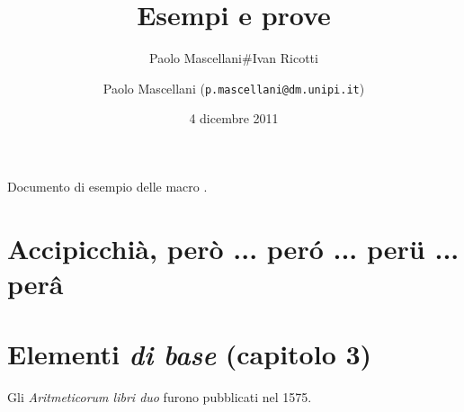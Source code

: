 \documentclass[12pt]{book}
\begin{document}
\htmlcut[inizio]
\par
{}
\title{Esempi e prove \MauroTeX}
\author{Paolo Mascellani#Ivan Ricotti}
\par
{}
\par
{}
\par
\author{Paolo Mascellani ({\tt p.mascellani@dm.unipi.it})}
\par
\date{4 dicembre 2011}
\par
\maketitle
\par
Documento di esempio delle macro 
\MTeX.
\label{gatto}
\section{Accipicchi{\`a}, però ... per{\'o} ... per{\"u} ... per{\^a}}
\par
\section{Elementi \textit{di base} (\textbf{capitolo 3})}\label{cane}
\par
Gli {\it Aritmeticorum libri duo} furono pubblicati nel 1575.
\par
\end{document}
